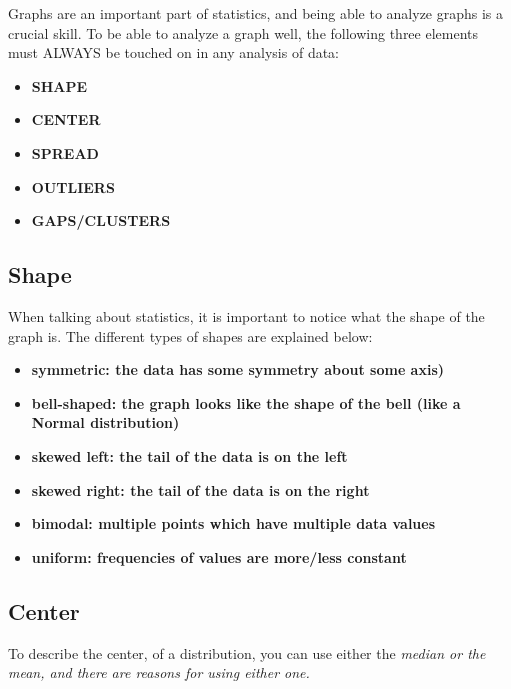 Graphs are an important part of statistics, and being able to analyze graphs is a crucial skill. To be able to analyze a graph well, the following three elements must ALWAYS be touched on in any analysis of data:

\begin{itemize}
    \item \bf{SHAPE}
    \item \bf{CENTER}
    \item \bf{SPREAD}
    \item \bf{OUTLIERS}
    \item \bf{GAPS/CLUSTERS}
\end{itemize}



\subsection{Shape}

When talking about statistics, it is important to notice what the shape of the graph is. The different types of shapes are explained below:

\begin{itemize}
    \item \bf{symmetric:} the data has some symmetry about some axis)
    \item \bf{bell-shaped:} the graph looks like the shape of the bell (like a Normal distribution)
    \item \bf{skewed left:} the tail of the data is on the left
    \item \bf{skewed right:} the tail of the data is on the right
    \item \bf{bimodal:} multiple points which have multiple data values
    \item \bf{uniform:} frequencies of values are more/less constant
\end{itemize}


\subsection{Center}

To describe the center, of a distribution, you can use either the \it{median} or the \it{mean}, and there are reasons for using either one.

